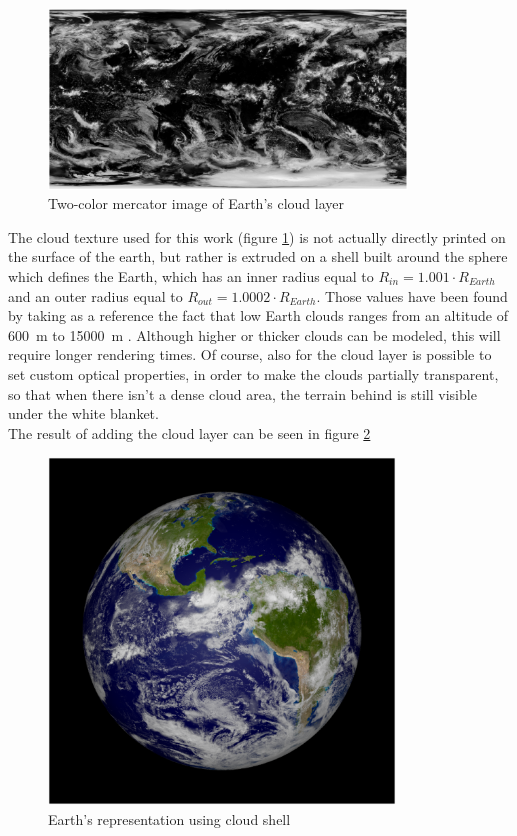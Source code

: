 \begin{figure}[htbp]
  \centering
  \includegraphics[width=0.85\textwidth]{gfx/clouds.eps}
  \caption{Two-color mercator image of Earth's cloud layer}
  \label{fig:cloudsMercator}
\end{figure}

The cloud texture used for this work (figure \ref{fig:cloudsMercator}) is not actually directly printed on the surface of the earth, but rather is extruded on a shell built around the sphere which defines the Earth, which has an inner radius equal to $R_{in} = 1.001 \cdot R_{Earth}$ and an outer radius equal to $R_{out} = 1.0002 \cdot  R_{Earth}$. Those values have been found by taking as a reference the fact that low Earth clouds ranges from an altitude of \SI{600}{\m} to \SI{15000}{\m} \cite{nimbostratus}. Although higher or thicker clouds can be modeled, this will require longer rendering times. Of course, also for the cloud layer is possible to set custom optical properties, in order to make the clouds partially transparent, so that when there isn't a dense cloud area, the terrain behind is still visible under the white blanket.\\
The result of adding the cloud layer can be seen in figure \ref{fig:cloudShell}

\begin{figure}[htbp]
  \centering
  \includegraphics[width=0.82\textwidth]{gfx/cloudShell.eps}
  \caption{Earth's representation using cloud shell}
  \label{fig:cloudShell}
\end{figure}

